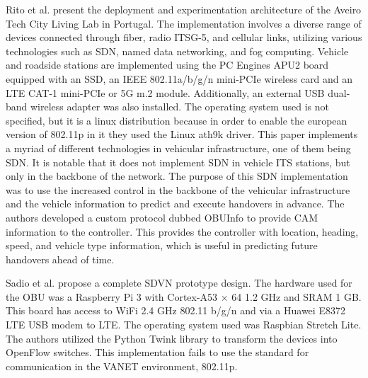     \cite{Rito et al., 2023}
    Rito et al. present the deployment and experimentation architecture of the Aveiro Tech City Living Lab in Portugal. The implementation involves a diverse range of devices connected through fiber, radio ITSG-5, and cellular links, utilizing various technologies such as SDN, named data networking, and fog computing.
    Vehicle and roadside stations are implemented using the PC Engines APU2 board equipped with an SSD, an IEEE 802.11a/b/g/n mini-PCIe wireless card and an LTE CAT-1 mini-PCIe or 5G m.2 module. Additionally, an external USB dual-band wireless adapter was also installed. The operating system used is not specified, but it is a linux distribution because in order to enable the european version of 802.11p in it they used the Linux ath9k driver.
    This paper implements a myriad of different technologies in vehicular infrastructure, one of them being SDN. It is notable that it does not implement SDN in vehicle ITS stations, but only in the backbone of the network. The purpose of this SDN implementation was to use the increased control in the backbone of the vehicular infrastructure and the vehicle information to predict and execute handovers in advance. The authors developed a custom protocol dubbed OBUInfo to provide CAM information to the controller. This provides the controller with location, heading, speed, and vehicle type information, which is useful in predicting future handovers ahead of time.
    
    \cite{Sadio et al., 2020}
    Sadio et al. propose a complete SDVN prototype design. The hardware used for the OBU was a Raspberry Pi 3 with Cortex-A53 × 64 1.2 GHz and SRAM 1 GB. This board has access to WiFi 2.4 GHz 802.11 b/g/n and via a Huawei E8372 LTE USB modem to LTE. The operating system used was Raspbian Stretch Lite. The authors utilized the Python Twink library to transform the devices into OpenFlow switches. This implementation fails to use the standard for communication in the VANET environment, 802.11p.
    
    